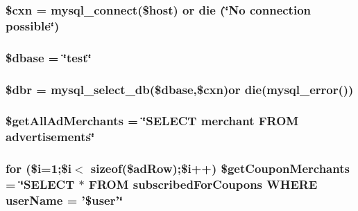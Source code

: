 \hypertarget{_m_c_maccount_settings_8php_afe14c5bdb9487c058ec831382f1fbacd}{
\subsubsection[{\$cxn}]{\setlength{\rightskip}{0pt plus 5cm}\$cxn = mysql\-\_\-connect(\$host) or die (\char`\"{}No connection possible\char`\"{})}}\label{_m_c_maccount_settings_8php_afe14c5bdb9487c058ec831382f1fbacd}
\hypertarget{_m_c_maccount_settings_8php_abd981912075cb8356ca370b4fefdfed7}{
\subsubsection[{\$dbase}]{\setlength{\rightskip}{0pt plus 5cm}\$dbase = \char`\"{}test\char`\"{}}}\label{_m_c_maccount_settings_8php_abd981912075cb8356ca370b4fefdfed7}
\hypertarget{_m_c_maccount_settings_8php_a88fea670240e5fa6ae306a286acaa0fd}{
\subsubsection[{\$dbr}]{\setlength{\rightskip}{0pt plus 5cm}\$dbr = mysql\-\_\-select\-\_\-db(\$dbase,\$cxn)or die(mysql\-\_\-error())}}\label{_m_c_maccount_settings_8php_a88fea670240e5fa6ae306a286acaa0fd}
\hypertarget{_m_c_maccount_settings_8php_a0c83e0e6bd8e9d8deee8baa4f03f6fc2}{
\subsubsection[{\$get\-All\-Ad\-Merchants}]{\setlength{\rightskip}{0pt plus 5cm}\$get\-All\-Ad\-Merchants = \char`\"{}S\-E\-L\-E\-C\-T merchant F\-R\-O\-M advertisements\char`\"{}}}\label{_m_c_maccount_settings_8php_a0c83e0e6bd8e9d8deee8baa4f03f6fc2}
\hypertarget{_m_c_maccount_settings_8php_ad7ff3bd6b64ab03c84762e87bdb49b94}{
\subsubsection[{\$get\-Coupon\-Merchants}]{\setlength{\rightskip}{0pt plus 5cm}for (\$i=1;\$i$<$ sizeof(\$ad\-Row);\$i++) \$get\-Coupon\-Merchants = \char`\"{}S\-E\-L\-E\-C\-T $\ast$ F\-R\-O\-M subscribed\-For\-Coupons W\-H\-E\-R\-E user\-Name = '\$user'\char`\"{}}}\label{_m_c_maccount_settings_8php_ad7ff3bd6b64ab03c84762e87bdb49b94}
